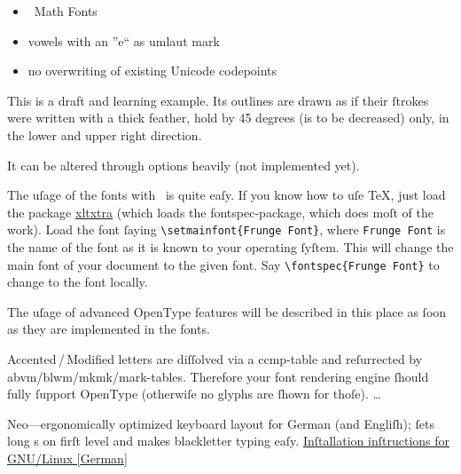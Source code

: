 \documentclass[
   titlepage=no]{scrartcl} %
\newcommand*\pkg[1]{\textsf{#1}}
\begin{document}
 \begin{itemize}
  \item \XeTeX\ Math Fonts
  \item vowels with an ”e“ as umlaut mark
  \item no overwriting of existing Unicode codepoints
 \end{itemize}



This is a draft and learning example. Its outlines are drawn as if their 
ſtrokes were written with a thick feather, hold by 45 degrees (is to be 
decreased) only, in the lower and upper right direction.

It can be altered through options heavily (not implemented yet).


 The uſage of the fonts with \XeTeX\ is quite eaſy. If you know how to 
uſe \TeX, just load the package 
\href{http://www.ctan.org/tex-archive/macros/xetex/latex/xltxtra/}{\pkg{xltxtra}} 
(which loads the \pkg{fontspec}-package, which does moſt of the work). 
Load the font ſaying \verb|\setmainfont{Frunge Font}|, where 
\verb|Frunge Font| is the name of the font as it is known to your 
operating ſyſtem. This will change the main font of your document to the 
given font. Say \verb|\fontspec{Frunge Font}| to change to the font 
locally.

The uſage of advanced OpenType features will be described in this place 
as ſoon as they are implemented in the fonts.


 Accented\,/\,Modified letters are diſſolved via a ccmp-table and 
reſurrected by abvm/blwm/mkmk/mark-tables. Therefore your font rendering 
engine ſhould fully ſupport OpenType (otherwiſe no glyphs are ſhown for 
thoſe). …




Neo—ergonomically optimized keyboard layout for German (and Engliſh); 
ſets long s on firſt level and makes blackletter typing eaſy. 
\href{http://wiki.neo-layout.org/wiki/Neo\%20unter\%20Linux\%20einrichten/Lang-s-Tastatur}{Inſtallation 
inſtructions for GNU/Linux [German]}
\end{document}
